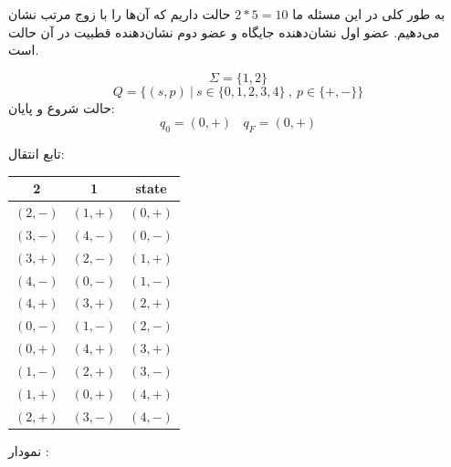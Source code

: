 به طور کلی در این مسئله ما 
\(2 * 5 = 10\) 
حالت داریم که آن‌ها را با زوج مرتب نشان می‌دهیم. عضو اول نشان‌دهنده جایگاه و عضو دوم نشان‌‌دهنده قطبیت در آن حالت است.

\[
\Sigma = \{ 1,2 \}
\]
\[
Q = \{ (s,p) \ | \ s \in \{0,1,2,3,4\} \ , \ p\in\{+,-\} \}
\]
حالت شروع و پایان:
\[
q_0 = (0,+) \ \ \ \ q_F = (0,+)\]

تابع انتقال:

\begin{table}[h]
    \centering
    \begin{RTL}
    \begin{tabular}{|c|c|c|}
    \hline
    2 & 1 & state \\
    \hline
    $(2,-)$ & $(1,+)$ & $(0,+)$ \\
    $(3,-)$ & $(4,-)$ & $(0,-)$ \\
    $(3,+)$ & $(2,-)$ & $(1,+)$ \\
    $(4,-)$ & $(0,-)$ & $(1,-)$ \\
    $(4,+)$ & $(3,+)$ & $(2,+)$ \\
    $(0,-)$ & $(1,-)$ & $(2,-)$ \\
    $(0,+)$ & $(4,+)$ & $(3,+)$ \\
    $(1,-)$ & $(2,+)$ & $(3,-)$ \\
    $(1,+)$ & $(0,+)$ & $(4,+)$ \\
    $(2,+)$ & $(3,-)$ & $(4,-)$ \\
    \hline
    \end{tabular}
    \end{RTL}
    \end{table}

نمودار :


